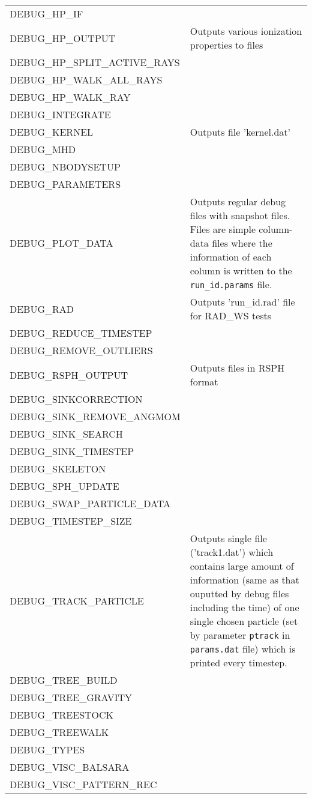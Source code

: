\documentclass[a4paper]{article}
\newcommand{\var}[1]{\texttt{#1}}
\begin{document}
\begin{center}
\begin{supertabular}{|p{6cm}|p{8cm}|}
DEBUG\_HP\_IF               & \\
DEBUG\_HP\_OUTPUT           & Outputs various ionization properties to files \\
DEBUG\_HP\_SPLIT\_ACTIVE\_RAYS & \\
DEBUG\_HP\_WALK\_ALL\_RAYS  & \\
DEBUG\_HP\_WALK\_RAY        & \\
DEBUG\_INTEGRATE            & \\
DEBUG\_KERNEL               & Outputs file 'kernel.dat' \\
DEBUG\_MHD                  & \\
DEBUG\_NBODYSETUP           & \\
DEBUG\_PARAMETERS           & \\
DEBUG\_PLOT\_DATA           & Outputs regular debug files with snapshot files.
                              Files are simple column-data files where the 
                              information of each column is written to the 
                              \var{run\_id.params} file.\\
DEBUG\_RAD                  & Outputs 'run\_id.rad' file for RAD\_WS tests \\
DEBUG\_REDUCE\_TIMESTEP     & \\
DEBUG\_REMOVE\_OUTLIERS     & \\
DEBUG\_RSPH\_OUTPUT         & Outputs files in RSPH format \\
DEBUG\_SINKCORRECTION       & \\
DEBUG\_SINK\_REMOVE\_ANGMOM & \\
DEBUG\_SINK\_SEARCH         & \\
DEBUG\_SINK\_TIMESTEP       & \\
DEBUG\_SKELETON             & \\
DEBUG\_SPH\_UPDATE          & \\
DEBUG\_SWAP\_PARTICLE\_DATA & \\
DEBUG\_TIMESTEP\_SIZE       & \\
DEBUG\_TRACK\_PARTICLE      & Outputs single file ('track1.dat') which 
                              contains large amount of information (same as 
                              that ouputted by debug files including the time) 
                              of one single chosen particle (set by parameter 
                              \var{ptrack} in \var{params.dat} file) which is 
                              printed every timestep. \\
DEBUG\_TREE\_BUILD          & \\
DEBUG\_TREE\_GRAVITY        & \\
DEBUG\_TREESTOCK            & \\
DEBUG\_TREEWALK             & \\
DEBUG\_TYPES                & \\
DEBUG\_VISC\_BALSARA        & \\
DEBUG\_VISC\_PATTERN\_REC   & \\
\end{supertabular}
\end{center}
\end{document}
